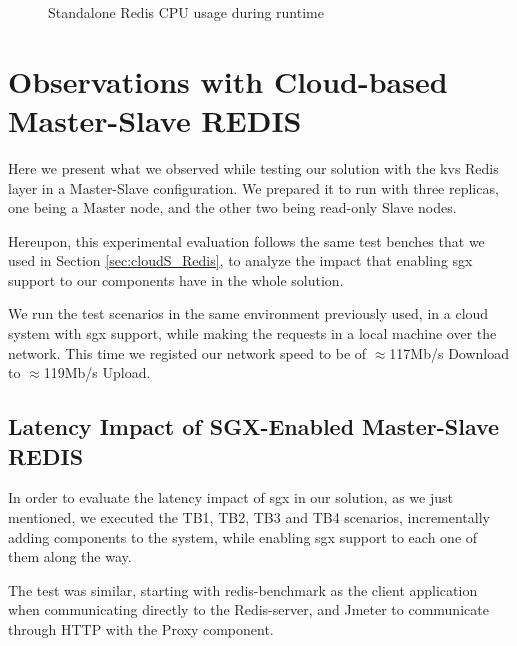 \begin{figure}[htbp]
	\centering
	\caption{Standalone Redis CPU usage during runtime}
	\label{fig:cpuUsageStandalone}
\end{figure}

\section{Observations with Cloud-based Master-Slave REDIS}
\label{sec:cloud_MS_Redis}

Here we present what we observed while testing our solution with the \gls{kvs} Redis layer in a Master-Slave configuration. We prepared it to run with three replicas, one being a Master node, and the other two being read-only Slave nodes. 

Hereupon, this experimental evaluation follows the same test benches that we used in Section \ref{sec:cloudS_Redis}, to analyze the impact that enabling \gls{sgx} support to our components have in the whole solution.

We run the test scenarios in the same environment previously used, in a cloud system with \gls{sgx} support, while making the requests in a local machine over the network. This time we registed our network speed to be of $\approx$117Mb/s Download to $\approx$119Mb/s Upload.


\subsection{Latency Impact of SGX-Enabled Master-Slave REDIS}

In order to evaluate the latency impact of \gls{sgx} in our solution, as we just mentioned, we executed the TB1, TB2, TB3 and TB4 scenarios, incrementally adding components to the system, while enabling \gls{sgx} support to each one of them along the way. 

The test was similar, starting with redis-benchmark as the client application when communicating directly to the Redis-server, and Jmeter to communicate through HTTP with the Proxy component.

